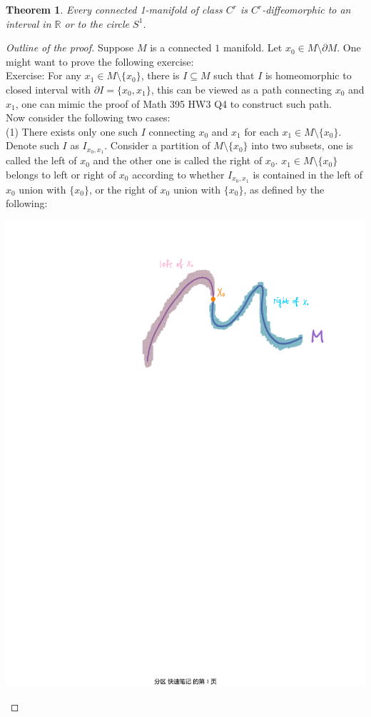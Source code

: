 \documentclass[15pt]{book}
\theoremstyle{break}
\theoremstyle{break}
\newtheorem{thm}{Theorem}[section]
\newcommand{\R}{\mathbb{R}}
\newcommand{\exercise}{\color{green}Exercise: \color{black}}
\begin{document}
\newpage
\begin{thm}
Every connected 1-manifold of class $C^r$ is $C^r$-diffeomorphic to an interval in $\R$ or to the circle $S^1$. 
\end{thm}
\begin{proof}[Outline of the proof]
Suppose $M$ is a connected $1$ manifold. Let $x_0 \in M \setminus \partial M$. One might want to prove the following exercise:\\

\exercise For any $x_1 \in M\setminus\{ x_0\}$, there is $I \subseteq M$ such that $I$ is homeomorphic to closed interval with $\partial I = \{ x_0,x_1\}$, this can be viewed as a path connecting $x_0$ and $x_1$, one can mimic the proof of Math 395 HW3 Q4 to construct such path.\\

Now consider the following two cases:\\
(1) There exists only one such $I$ connecting $x_0$ and $x_1$ for each $x_1\in M\setminus\{ x_0\}$. Denote such $I$ as $I_{x_0,x_1}$. Consider a partition of $M\setminus \{x_0\}$ into two subsets, one is called the left of $x_0$ and the other one is called the right of $x_0$. $x_1 \in M\setminus \{x_0\}$ belongs to left or right of $x_0$ according to whether $I_{x_0,x_1}$ is contained in the left of $x_0$ union with $\{x_0\}$, or the right of $x_0$ union with $\{x_0\}$, as defined by the following:

\begin{center}
\includegraphics[scale=0.5]{1-manifoldHom.pdf}
\end{center}


\end{proof}
\end{document}
